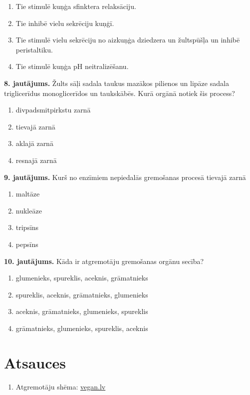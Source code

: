\documentclass[12pt,a4paper]{article}
\begin{document}
\begin{enumerate}[label=\Alph*.]
    \item Tie stimulē kuņģa sfinktera relaksāciju.
    \item Tie inhibē vielu sekrēciju kuņģī.
    \item Tie stimulē vielu sekrēciju no aizkuņģa dziedzera un žultspūšļa un inhibē peristaltiku.
    \item Tie stimulē kuņģa pH neitralizēšanu.
\end{enumerate}

\noindent \textbf{8. jautājums.} Žults sāļi sadala taukus mazākos pilienos un lipāze sadala triglicerīdus monoglicerīdos un taukskābēs. Kurā orgānā notiek šis process? 

\begin{enumerate}[label=\Alph*.]
    \item divpadsmitpirkstu zarnā
    \item tievajā zarnā
    \item aklajā zarnā
    \item resnajā zarnā
\end{enumerate}

\noindent \textbf{9. jautājums.} Kurš no enzīmiem nepiedalās gremošanas procesā tievajā zarnā

\begin{enumerate}[label=\Alph*.]
    \item maltāze
    \item nukleāze
    \item tripsīns
    \item pepsīns
\end{enumerate}

\noindent \textbf{10. jautājums.} Kāda ir atgremotāju gremošanas orgānu secība? 
\begin{enumerate}[label=\Alph*.]
    \item glumenieks, spureklis, aceknis, grāmatnieks
    \item  spureklis, aceknis, grāmatnieks, glumenieks
    \item aceknis, grāmatnieks, glumenieks, spureklis
    \item grāmatnieks, glumenieks, spureklis, aceknis
\end{enumerate}


\section*{Atsauces}
\begin{enumerate}[leftmargin=*]
    \item Atgremotāju shēma: \url{vegan.lv}
\end{enumerate}
\end{document}
